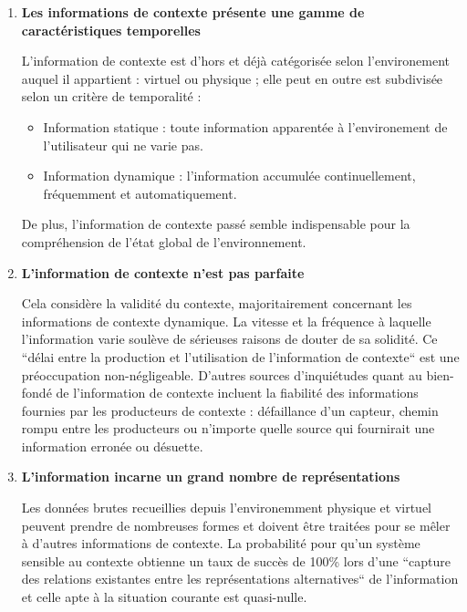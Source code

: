 \begin{enumerate}
    \item \textbf{Les informations de contexte présente une gamme de
	    caractéristiques temporelles}

	    L'information de contexte est d'hors et déjà catégorisée selon
	    l'environement auquel il appartient : virtuel ou physique ; elle
	    peut en outre est subdivisée selon un critère de temporalité :

            \begin{itemize}
		\item Information statique : toute information apparentée à
			l'environement de l'utilisateur qui ne varie pas.
		\item Information dynamique : l'information accumulée
			continuellement, fréquemment et automatiquement.
            \end{itemize}

	    De plus, l'information de contexte passé semble indispensable pour
	    la compréhension de l'état global de l'environnement.

    \item \textbf{L'information de contexte n'est pas parfaite}

	    Cela considère la validité du contexte, majoritairement concernant
	    les informations de contexte dynamique. La vitesse et la fréquence à
	    laquelle l'information varie soulève de sérieuses raisons de
	    douter de sa solidité. Ce ``délai entre la production et
	    l'utilisation de l'information de contexte``
	    \cite{catharina_context_2002} est une préoccupation non-négligeable.
            D'autres sources d'inquiétudes quant au bien-fondé de
	    l'information de contexte incluent la fiabilité des informations
	    fournies par les producteurs de contexte : défaillance d'un capteur,
	    chemin rompu entre les producteurs ou n'importe quelle source qui
	    fournirait une information erronée ou désuette.

    \item \textbf{L'information incarne un grand nombre de représentations}

            Les données brutes recueillies depuis l'environemment physique et
	    virtuel peuvent prendre de nombreuses formes et doivent être
	    traitées pour se mêler à d'autres informations de contexte. La
	    probabilité pour qu'un système sensible au contexte obtienne un taux
	    de succès de 100\% lors d'une ``capture des relations existantes
	    entre les représentations alternatives``
	    \cite{catharina_context_2002}  de l'information et celle apte à la
	    situation courante est quasi-nulle.


\end{enumerate}
